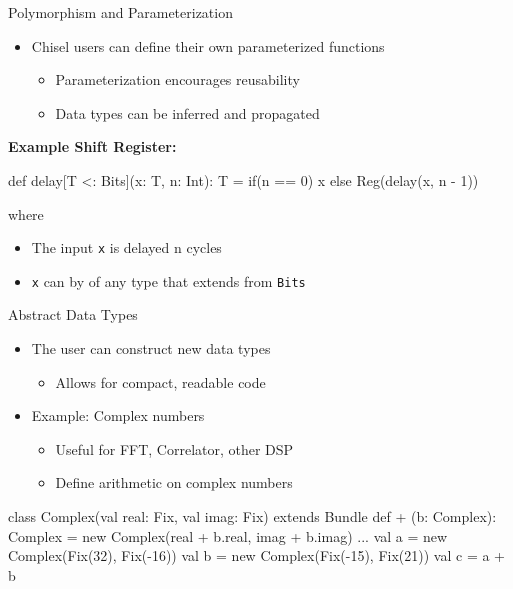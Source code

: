 \documentclass[xcolor=pdflatex,dvipsnames,table]{beamer}
\begin{document}
\begin{frame}[fragile]{Polymorphism and Parameterization}
\begin{itemize}
\item Chisel users can define their own parameterized functions
\begin{itemize}
\item Parameterization encourages reusability
\item Data types can be inferred and propagated
\end{itemize}
\end{itemize}

\textbf{Example Shift Register:}
\begin{scala}
def delay[T <: Bits](x: T, n: Int): T = 
  if(n == 0) x else Reg(delay(x, n - 1))
\end{scala}
where
\begin{itemize}
\item The input \verb+x+ is delayed n cycles
\item \verb+x+ can by of any type that extends from \verb+Bits+
\end{itemize}

\end{frame}

\begin{frame}[fragile]{Abstract Data Types}
\begin{itemize}
\item The user can construct new data types
\begin{itemize}
\item Allows for compact, readable code
\end{itemize}
\item Example: Complex numbers
\begin{itemize}
\item Useful for FFT, Correlator, other DSP
\item Define arithmetic on complex numbers
\end{itemize}
\end{itemize}

\begin{footnotesize}
\begin{scala}
class Complex(val real: Fix, val imag: Fix) 
    extends Bundle {
  def + (b: Complex): Complex = 
    new Complex(real + b.real, imag + b.imag)
  ...
}
val a = new Complex(Fix(32), Fix(-16))
val b = new Complex(Fix(-15), Fix(21))
val c = a + b
\end{scala}
\end{footnotesize}

\end{frame}
\end{document}
